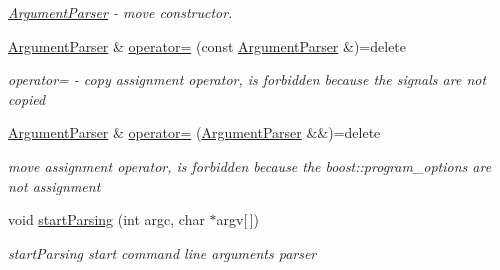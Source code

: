 \begin{DoxyCompactItemize}
\begin{DoxyCompactList}\small\item\em \hyperlink{classmin__path_1_1argument__parser_1_1_argument_parser}{Argument\+Parser} -\/ move constructor. \end{DoxyCompactList}\item 
\hyperlink{classmin__path_1_1argument__parser_1_1_argument_parser}{Argument\+Parser} \& \hyperlink{classmin__path_1_1argument__parser_1_1_argument_parser_a5c4f3f8135e422646c435d831044528d}{operator=} (const \hyperlink{classmin__path_1_1argument__parser_1_1_argument_parser}{Argument\+Parser} \&)=delete
\begin{DoxyCompactList}\small\item\em operator= -\/ copy assignment operator, is forbidden because the signals are not copied \end{DoxyCompactList}\item 
\hyperlink{classmin__path_1_1argument__parser_1_1_argument_parser}{Argument\+Parser} \& \hyperlink{classmin__path_1_1argument__parser_1_1_argument_parser_a5158bbe2aac6767154d0e25a8cb66a6a}{operator=} (\hyperlink{classmin__path_1_1argument__parser_1_1_argument_parser}{Argument\+Parser} \&\&)=delete
\begin{DoxyCompactList}\small\item\em move assignment operator, is forbidden because the boost\+::program\+\_\+options are not assignment \end{DoxyCompactList}\item 
void \hyperlink{classmin__path_1_1argument__parser_1_1_argument_parser_a9d84b7749b05e439efcd353dde3e0586}{start\+Parsing} (int argc, char $\ast$argv\mbox{[}$\,$\mbox{]})
\begin{DoxyCompactList}\small\item\em start\+Parsing start command line arguments parser \end{DoxyCompactList}\end{DoxyCompactItemize}
